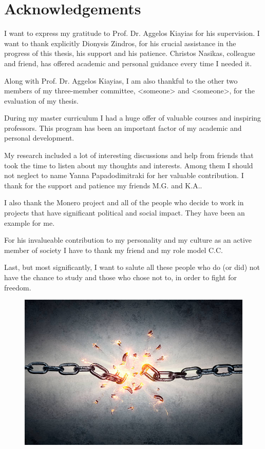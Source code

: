 \chapter*{Acknowledgements}
I want to express my gratitude to Prof. Dr. Aggelos Kiayias for his supervision. I want to thank explicitly Dionysis Zindros, for his crucial assistance in the progress of this thesis, his support and his patience. Christos Nasikas, colleague and friend, has offered academic and personal guidance every time I needed it.

Along with Prof. Dr. Aggelos Kiayias, I am also thankful to the other two members of my three-member committee, <someone> and <someone>, for the evaluation of my thesis.

During my master curriculum I had a huge offer of valuable courses and inspiring professors. This program has been an important factor of my academic and personal development.

My research included a lot of interesting discussions and help from friends that took the time to listen about my thoughts and interests. Among them I should not neglect to name Yanna Papadodimitraki for her valuable contribution. I thank for the support and patience my friends M.G. and K.A..

I also thank the Monero project and all of the people who decide to work in projects that have significant political and social impact. They have been an example for me.

For his invalueable contribution to my personality and my culture as an active member of society I have to thank my friend and my role model C.C.

Last, but most significantly, I want to salute all these people who do (or did) not have the chance to study and those who chose not to, in order to fight for freedom.
\begin{figure}[H]
  \centering
  \includegraphics[scale=0.30,keepaspectratio]{Images/Acknowledgements/broken-chain.jpg}
\end{figure}
%
